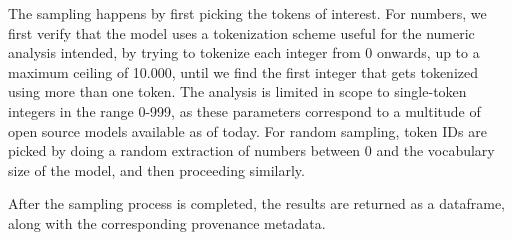 \documentclass[
  a4paper, twoside, 10pt, titlepage]{book}
\begin{document}
The sampling happens by first picking the tokens of interest. For
numbers, we first verify that the model uses a tokenization scheme
useful for the numeric analysis intended, by trying to tokenize each
integer from 0 onwards, up to a maximum ceiling of 10.000, until we find
the first integer that gets tokenized using more than one token. The
analysis is limited in scope to single-token integers in the range
0-999, as these parameters correspond to a multitude of open source
models available as of today. For random sampling, token IDs are picked
by doing a random extraction of numbers between 0 and the vocabulary
size of the model, and then proceeding similarly.

After the sampling process is completed, the results are returned as a
dataframe, along with the corresponding provenance metadata.
\end{document}

